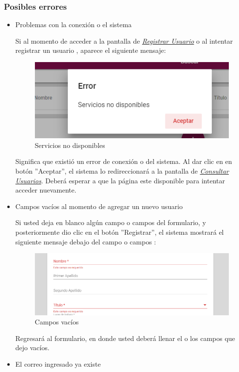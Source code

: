   \subsubsection{Posibles errores}

  \begin{itemize}
  	\item Problemas con la conexión o el sistema

  	Si al momento de acceder a la pantalla de \hyperlink{registrarUs}{\textit{Registrar Usuario}} o al intentar registrar un usuario , aparece el siguiente mensaje:

  	\begin{figure}[H]
  		\centering
  		\includegraphics[width=0.4\linewidth]{images/SP5/MSGSN}
  		\caption{Servicios no disponibles}
  		\label{SND}

  	\end{figure}

  	Significa que existió un error de conexión o del sistema. Al dar clic en en botón ''Aceptar'', el sistema lo redireccionará a la pantalla de \hyperlink{consultarUs}{\textit{Consultar Usuarios}}. Deberá esperar a que la página este disponible para  intentar acceder nuevamente.

  	\item Campos vacíos al momento de agregar un nuevo usuario

  	Si usted deja en blanco algún campo o campos del formulario, y posteriormente dio clic en el botón ''Registrar'', el sistema mostrará el siguiente mensaje debajo del campo o campos :

  	\begin{figure}[H]
  		\centering
  		\includegraphics[width=0.4\linewidth]{images/SP5/MSG44}
  		\caption{Campos vacíos}
  		\label{mensaje44}
  	\end{figure}

  	Regresará al formulario, en donde usted deberá llenar el o los campos que dejo vacíos.

  	\item El correo ingresado ya existe


\end{itemize}
